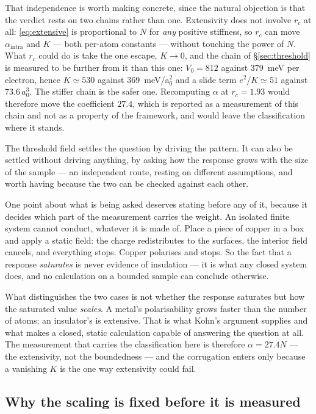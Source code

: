 \documentclass[11pt]{article}
\begin{document}
That independence is worth making concrete, since the natural objection is that the verdict rests on
two chains rather than one. Extensivity does not involve $r_c$ at all: \eqref{eq:extensive} is
proportional to $N$ for \emph{any} positive stiffness, so $r_c$ can move $\alpha_{\text{intra}}$ and
$K$ --- both per-atom constants --- without touching the power of $N$. What $r_c$ could do is take
the one escape, $K\to0$, and the chain of \S\ref{sec:threshold} is measured to be further from it
than this one: $V_0=812$ against $379$~meV per electron, hence $K\simeq530$ against
$369$~meV/a$_0^2$ and a slide term $e^2/K\simeq51$ against $73.6\,a_0^3$. The stiffer chain is the
safer one. Recomputing $\alpha$ at $r_c=1.93$ would therefore move the coefficient $27.4$, which is
reported as a measurement of this chain and not as a property of the framework, and would leave the
classification where it stands.

The threshold field settles the question by driving the pattern. It can also be settled without
driving anything, by asking how the response grows with the size of the sample --- an independent
route, resting on different assumptions, and worth having because the two can be checked against
each other.

One point about what is being asked deserves stating before any of it, because it decides which
part of the measurement carries the weight. An isolated finite system cannot conduct, whatever it is
made of. Place a piece of copper in a box and apply a static field: the charge redistributes to the
surfaces, the interior field cancels, and everything stops. Copper polarises and stops. So the fact
that a response \emph{saturates} is never evidence of insulation --- it is what any closed system
does, and no calculation on a bounded sample can conclude otherwise.

What distinguishes the two cases is not whether the response saturates but how the saturated value
\emph{scales}. A metal's polarisability grows faster than the number of atoms; an insulator's is
extensive. That is what Kohn's argument supplies and what makes a closed, static calculation
capable of answering the question at all. The measurement that carries the classification here is
therefore $\alpha = 27.4N$ --- the extensivity, not the boundedness --- and the corrugation enters
only because a vanishing $K$ is the one way extensivity could fail.

\subsection{Why the scaling is fixed before it is measured}
\end{document}
